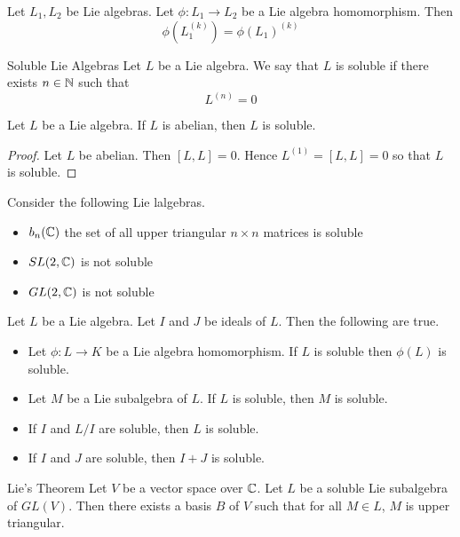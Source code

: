 \documentclass[a4paper]{article}
\begin{document}
\begin{lmm}{}{} Let $L_1,L_2$ be Lie algebras. Let $\phi:L_1\to L_2$ be a Lie algebra homomorphism. Then $$\phi(L_1^{(k)})=\phi(L_1)^{(k)}$$
\end{lmm}

\begin{defn}{Soluble Lie Algebras}{} Let $L$ be a Lie algebra. We say that $L$ is soluble if there exists $n\in\mathbb{N}$ such that $$L^{(n)}=0$$
\end{defn}

\begin{lmm}{}{} Let $L$ be a Lie algebra. If $L$ is abelian, then $L$ is soluble. \tcbline
\begin{proof}
Let $L$ be abelian. Then $[L,L]=0$. Hence $L^{(1)}=[L,L]=0$ so that $L$ is soluble. 
\end{proof}
\end{lmm}

\begin{eg}{}{} Consider the following Lie lalgebras. 
\begin{itemize}
\item $b_n(\mathbb{C})$ the set of all upper triangular $n\times n$ matrices is soluble
\item $SL(2,\mathbb{C})$ is not soluble
\item $GL(2,\mathbb{C})$ is not soluble
\end{itemize}
\end{eg}

\begin{prp}{}{} Let $L$ be a Lie algebra. Let $I$ and $J$ be ideals of $L$. Then the following are true. 
\begin{itemize}
\item Let $\phi:L\to K$ be a Lie algebra homomorphism. If $L$ is soluble then $\phi(L)$ is soluble. 
\item Let $M$ be a Lie subalgebra of $L$. If $L$ is soluble, then $M$ is soluble. 
\item If $I$ and $L/I$ are soluble, then $L$ is soluble. 
\item If $I$ and $J$ are soluble, then $I+J$ is soluble. 
\end{itemize}
\end{prp}

\begin{thm}{Lie's Theorem}{} Let $V$ be a vector space over $\mathbb{C}$. Let $L$ be a soluble Lie subalgebra of $GL(V)$. Then there exists a basis $B$ of $V$ such that for all $M\in L$, $M$ is upper triangular. 
\end{thm}
\end{document}
